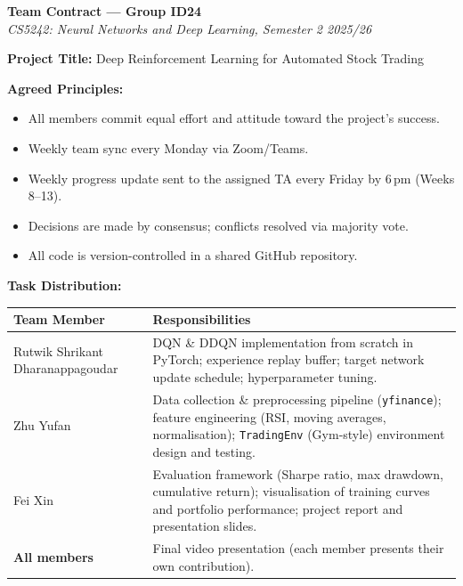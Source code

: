 \documentclass[10pt,twocolumn]{article}
\begin{document}
\newpage
\onecolumn
\begin{center}
  {\LARGE\textbf{Team Contract --- Group ID24}}\\[6pt]
  \textit{CS5242: Neural Networks and Deep Learning, Semester 2 2025/26}
\end{center}

\bigskip
\noindent\textbf{Project Title:} Deep Reinforcement Learning for Automated Stock Trading

\bigskip
\noindent\textbf{Agreed Principles:}
\begin{itemize}
  \item All members commit equal effort and attitude toward the project's success.
  \item Weekly team sync every Monday via Zoom/Teams.
  \item Weekly progress update sent to the assigned TA every Friday by 6\,pm (Weeks 8--13).
  \item Decisions are made by consensus; conflicts resolved via majority vote.
  \item All code is version-controlled in a shared GitHub repository.
\end{itemize}

\bigskip
\noindent\textbf{Task Distribution:}

\bigskip
\begin{center}
\begin{tabular}{p{5.5cm} p{9.5cm}}
\toprule
\textbf{Team Member} & \textbf{Responsibilities} \\
\midrule
Rutwik Shrikant Dharanappagoudar &
  DQN \& DDQN implementation from scratch in PyTorch;
  experience replay buffer; target network update schedule;
  hyperparameter tuning. \\[6pt]
Zhu Yufan &
  Data collection \& preprocessing pipeline (\texttt{yfinance});
  feature engineering (RSI, moving averages, normalisation);
  \texttt{TradingEnv} (Gym-style) environment design and testing. \\[6pt]
Fei Xin &
  Evaluation framework (Sharpe ratio, max drawdown, cumulative return);
  visualisation of training curves and portfolio performance;
  project report and presentation slides. \\[4pt]
\midrule
\textbf{All members} &
  Final video presentation (each member presents their own contribution). \\
\bottomrule
\end{tabular}
\end{center}
\end{document}
